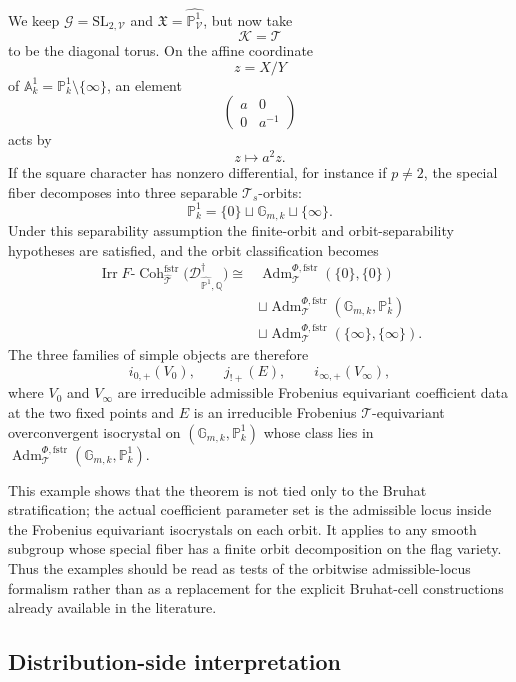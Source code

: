 \documentclass[11pt]{amsart}
\theoremstyle{plain}
\theoremstyle{definition}
\theoremstyle{remark}
\newcommand{\fstr}{\mathrm{fstr}}
\newcommand{\Adm}{\operatorname{Adm}}
\begin{document}
We keep \(\mathcal G=\mathrm{SL}_{2,\mathcal V}\) and
\(\mathfrak X=\widehat{\mathbb P^1_{\mathcal V}}\), but now take
\[
  \mathcal K=\mathcal T
\]
to be the diagonal torus. On the affine coordinate
\[
  z=X/Y
\]
of \(\mathbb A^1_k=\mathbb P^1_k\setminus\{\infty\}\), an element
\[
  \begin{pmatrix}
  a & 0 \\
  0 & a^{-1}
  \end{pmatrix}
\]
acts by
\[
  z\longmapsto a^2 z.
\]
If the square character has nonzero differential, for instance if
\(p\neq2\), the special fiber decomposes into three separable
\(\mathcal T_s\)-orbits:
\[
  \mathbb P^1_k=\{0\}\sqcup \mathbb G_{m,k}\sqcup \{\infty\}.
\]
Under this separability assumption the finite-orbit and orbit-separability hypotheses are satisfied, and the orbit classification
becomes
\[
\begin{aligned}
  \operatorname{Irr}
  F\text{-}\operatorname{Coh}^{\fstr}_{\widehat{\mathcal T}}
  \bigl(\mathscr D^\dagger_{\widehat{\mathbb P^1},\mathbb Q}\bigr)
  \cong{}&
  \Adm^{\Phi,\fstr}_{\mathcal T}(\{0\},\{0\}) \\
  &\sqcup
  \Adm^{\Phi,\fstr}_{\mathcal T}(\mathbb G_{m,k},\mathbb P^1_k) \\
  &\sqcup
  \Adm^{\Phi,\fstr}_{\mathcal T}(\{\infty\},\{\infty\}).
\end{aligned}
\]
The three families of simple objects are therefore
\[
  i_{0,+}(V_0),
  \qquad
  j_{!+}(E),
  \qquad
  i_{\infty,+}(V_\infty),
\]
where \(V_0\) and \(V_\infty\) are irreducible admissible Frobenius equivariant
coefficient data at the two fixed points and \(E\) is an irreducible Frobenius
\(\mathcal T\)-equivariant overconvergent isocrystal on
\((\mathbb G_{m,k},\mathbb P^1_k)\) whose class lies in
\(\Adm^{\Phi,\fstr}_{\mathcal T}(\mathbb G_{m,k},\mathbb P^1_k)\).

This example shows that the theorem is not tied only to the Bruhat
stratification; the actual coefficient parameter set is the admissible locus
inside the Frobenius equivariant isocrystals on each orbit. It applies to any
smooth subgroup whose special fiber has a finite orbit decomposition on the
flag variety.  Thus the examples should be read as tests of the orbitwise
admissible-locus formalism rather than as a replacement for the explicit
Bruhat-cell constructions already available in the literature.

\subsection{Distribution-side interpretation}
\end{document}
